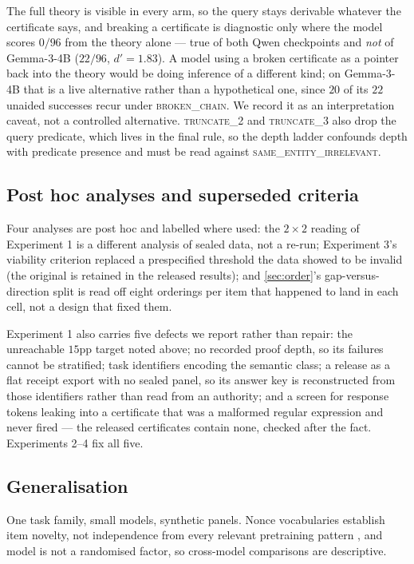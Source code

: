 \documentclass[10pt,twocolumn]{article}
\begin{document}
The full theory is visible in every arm, so the query stays derivable whatever
the certificate says, and breaking a certificate is diagnostic only where the
model scores $0/96$ from the theory alone --- true of both Qwen checkpoints and
\emph{not} of Gemma-3-4B ($22/96$, $d' = 1.83$). A model using a broken
certificate as a pointer back into the theory would be doing inference of a
different kind; on Gemma-3-4B that is a live alternative rather than a
hypothetical one, since $20$ of its $22$ unaided successes recur under
\textsc{broken\_chain}. We record it as an interpretation caveat, not a
controlled alternative. \textsc{truncate\_2} and \textsc{truncate\_3} also drop the query predicate, which
lives in the final rule, so the depth ladder confounds depth with predicate
presence and must be read against \textsc{same\_entity\_irrelevant}.

\subsection{Post hoc analyses and superseded criteria}

Four analyses are post hoc and labelled where used: the $2\times2$ reading of
Experiment 1 is a different analysis of sealed data, not a re-run; Experiment 3's
viability criterion replaced a prespecified threshold the data showed to be
invalid (the original is retained in the released results); and \cref{sec:order}'s gap-versus-direction split is read off eight orderings per
item that happened to land in each cell, not a design that fixed them.

Experiment 1 also carries five defects we report rather than repair: the
unreachable $15$pp target noted above; no recorded proof depth, so its failures
cannot be stratified; task identifiers encoding the semantic class; a release as
a flat receipt export with no sealed panel, so its answer key is reconstructed
from those identifiers rather than read from an authority; and a screen for
response tokens leaking into a certificate that was a malformed regular
expression and never fired --- the released certificates contain none, checked
after the fact. Experiments 2--4 fix all five.

\subsection{Generalisation}

One task family, small models, synthetic panels. Nonce vocabularies establish
item novelty, not independence from every relevant pretraining pattern
\citep{golchin2023time,deng2024investigating}, and model is not a randomised
factor, so cross-model comparisons are descriptive.
\end{document}
